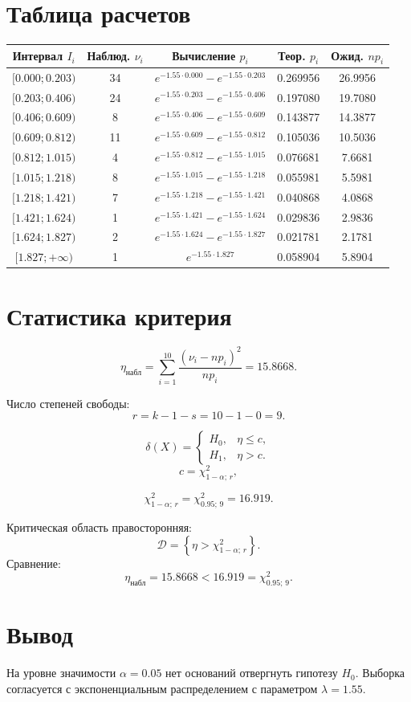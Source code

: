 \documentclass[12pt,a4paper]{article}
\begin{document}
\section*{Таблица расчетов}
\begin{center}
\small
\begin{tabular}{ccccc}
\toprule
Интервал $I_i$ & Наблюд. $\nu_i$ & Вычисление $p_i$ & Теор. $p_i$ & Ожид. $n p_i$ \\
\midrule
$[0.000;0.203)$ & 34 & $e^{-1.55\cdot 0.000}-e^{-1.55\cdot 0.203}$ & 0.269956 & 26.9956 \\
$[0.203;0.406)$ & 24 & $e^{-1.55\cdot 0.203}-e^{-1.55\cdot 0.406}$ & 0.197080 & 19.7080 \\
$[0.406;0.609)$ & 8  & $e^{-1.55\cdot 0.406}-e^{-1.55\cdot 0.609}$ & 0.143877 & 14.3877 \\
$[0.609;0.812)$ & 11 & $e^{-1.55\cdot 0.609}-e^{-1.55\cdot 0.812}$ & 0.105036 & 10.5036 \\
$[0.812;1.015)$ & 4  & $e^{-1.55\cdot 0.812}-e^{-1.55\cdot 1.015}$ & 0.076681 & 7.6681 \\
$[1.015;1.218)$ & 8  & $e^{-1.55\cdot 1.015}-e^{-1.55\cdot 1.218}$ & 0.055981 & 5.5981 \\
$[1.218;1.421)$ & 7  & $e^{-1.55\cdot 1.218}-e^{-1.55\cdot 1.421}$ & 0.040868 & 4.0868 \\
$[1.421;1.624)$ & 1  & $e^{-1.55\cdot 1.421}-e^{-1.55\cdot 1.624}$ & 0.029836 & 2.9836 \\
$[1.624;1.827)$ & 2  & $e^{-1.55\cdot 1.624}-e^{-1.55\cdot 1.827}$ & 0.021781 & 2.1781 \\
$[1.827;+\infty)$ & 1 & $e^{-1.55\cdot 1.827}$ & 0.058904 & 5.8904 \\
\bottomrule
\end{tabular}
\normalsize
\end{center}

\section*{Статистика критерия}
\[
\eta_{\text{набл}}=\sum_{i=1}^{10}\frac{(\nu_i-np_i)^2}{np_i}=15.8668.
\]

Число степеней свободы:
\[
r = k-1-s = 10-1-0=9.
\]

\[
\delta(X)=
\begin{cases}
H_0, & \eta \le c,\\
H_1, & \eta > c.
\end{cases}
\]
\[
c=\chi^2_{1-\alpha;\,r},
\]

\[
\chi^2_{1-\alpha;\,r}=\chi^2_{0.95;\,9}=16.919.
\]

Критическая область правосторонняя:
\[
\mathcal{D}=\left\{\eta>\chi^2_{1-\alpha;\,r}\right\}.
\]
Сравнение:
\[
\eta_{\text{набл}}=15.8668 < 16.919=\chi^2_{0.95;\,9}.
\]

\section*{Вывод}
На уровне значимости $\alpha=0.05$ нет оснований отвергнуть гипотезу $H_0$.
Выборка согласуется с экспоненциальным распределением с параметром $\lambda=1.55$.
\end{document}
